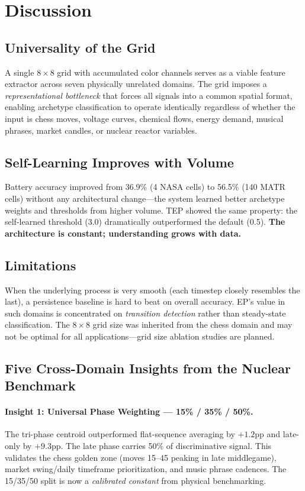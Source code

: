 \documentclass[12pt,a4paper]{article}
\begin{document}
\section{Discussion}
\label{sec:discussion}

\subsection{Universality of the Grid}
A single $8{\times}8$ grid with accumulated color channels serves as a viable feature extractor
across seven physically unrelated domains. The grid imposes a \emph{representational bottleneck}
that forces all signals into a common spatial format, enabling archetype classification to operate
identically regardless of whether the input is chess moves, voltage curves, chemical flows, energy
demand, musical phrases, market candles, or nuclear reactor variables.

\subsection{Self-Learning Improves with Volume}
Battery accuracy improved from 36.9\% (4 NASA cells) to 56.5\% (140 MATR cells) without any
architectural change---the system learned better archetype weights and thresholds from higher
volume. TEP showed the same property: the self-learned threshold (3.0) dramatically outperformed
the default (0.5). \textbf{The architecture is constant; understanding grows with data.}

\subsection{Limitations}
When the underlying process is very smooth (each timestep closely resembles the last), a
persistence baseline is hard to beat on overall accuracy. EP's value in such domains is
concentrated on \emph{transition detection} rather than steady-state classification. The $8{\times}8$
grid size was inherited from the chess domain and may not be optimal for all applications---grid
size ablation studies are planned.

\subsection{Five Cross-Domain Insights from the Nuclear Benchmark}

\paragraph{Insight 1: Universal Phase Weighting --- 15\% / 35\% / 50\%.}
The tri-phase centroid outperformed flat-sequence averaging by $+1.2$pp and late-only by $+9.3$pp.
The late phase carries 50\% of discriminative signal. This validates the chess golden zone (moves
15--45 peaking in late middlegame), market swing/daily timeframe prioritization, and music phrase
cadences. The 15/35/50 split is now a \emph{calibrated constant} from physical benchmarking.
\end{document}
